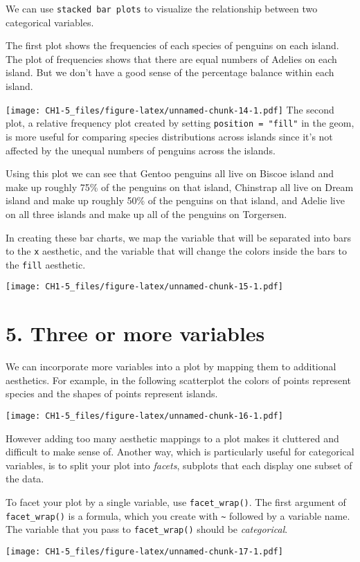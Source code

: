 \documentclass[
]{article}
\begin{document}
We can use \texttt{stacked\ bar\ plots} to visualize the relationship
between two categorical variables.

The first plot shows the frequencies of each species of penguins on each
island. The plot of frequencies shows that there are equal numbers of
Adelies on each island. But we don't have a good sense of the percentage
balance within each island.

\texttt{[image: CH1-5\_files/figure-latex/unnamed-chunk-14-1.pdf]} The
second plot, a relative frequency plot created by setting
\texttt{position\ =\ "fill"} in the geom, is more useful for comparing
species distributions across islands since it's not affected by the
unequal numbers of penguins across the islands.

Using this plot we can see that Gentoo penguins all live on Biscoe
island and make up roughly 75\% of the penguins on that island,
Chinstrap all live on Dream island and make up roughly 50\% of the
penguins on that island, and Adelie live on all three islands and make
up all of the penguins on Torgersen.

In creating these bar charts, we map the variable that will be separated
into bars to the \texttt{x} aesthetic, and the variable that will change
the colors inside the bars to the \texttt{fill} aesthetic.

\texttt{[image: CH1-5\_files/figure-latex/unnamed-chunk-15-1.pdf]}

\hypertarget{three-or-more-variables}{%
\section{5. Three or more variables}\label{three-or-more-variables}}

We can incorporate more variables into a plot by mapping them to
additional aesthetics. For example, in the following scatterplot the
colors of points represent species and the shapes of points represent
islands.

\texttt{[image: CH1-5\_files/figure-latex/unnamed-chunk-16-1.pdf]}

However adding too many aesthetic mappings to a plot makes it cluttered
and difficult to make sense of. Another way, which is particularly
useful for categorical variables, is to split your plot into
\emph{facets}, subplots that each display one subset of the data.

To facet your plot by a single variable, use \texttt{facet\_wrap()}. The
first argument of \texttt{facet\_wrap()} is a formula, which you create
with \texttt{\textasciitilde{}} followed by a variable name. The
variable that you pass to \texttt{facet\_wrap()} should be
\emph{categorical}.

\texttt{[image: CH1-5\_files/figure-latex/unnamed-chunk-17-1.pdf]}
\end{document}
